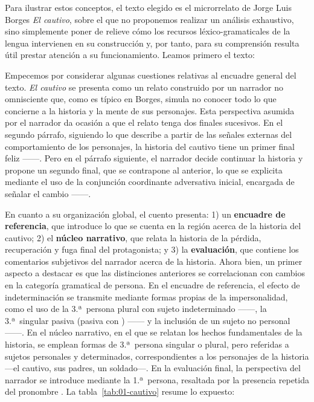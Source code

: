 Para ilustrar estos conceptos, el texto elegido es el microrrelato de Jorge
Luis Borges \textit{El cautivo}, sobre el que no proponemos realizar un
análisis exhaustivo, sino simplemente poner de relieve cómo los recursos
léxico-gramaticales de la lengua intervienen en su construcción y, por tanto,
para su comprensión resulta útil prestar atención a su funcionamiento. Leamos
primero el texto:

\begin{textolectura}[El cautivo, de J. L. Borges]
\end{textolectura}

Empecemos por considerar algunas cuestiones relativas al encuadre general del
texto. \textit{El cautivo} se presenta como un relato construido por un
narrador no omnisciente que, como es típico en Borges, simula no conocer todo
lo que concierne a la historia y la mente de sus personajes. Esta perspectiva
asumida por el narrador da ocasión a que el relato tenga dos finales sucesivos.
En el segundo párrafo, siguiendo lo que describe a partir de las señales
externas del comportamiento de los personajes, la historia del cautivo tiene un
primer final feliz ------. Pero en el párrafo siguiente, el
narrador decide continuar la historia y propone un segundo final, que se
contrapone al anterior, lo que se explicita mediante el uso de la conjunción
coordinante adversativa inicial, encargada de señalar el cambio
------.

En cuanto a su organización global, el cuento presenta: 1) un \textbf{encuadre
de referencia}, que introduce lo que se cuenta en la región acerca de la
historia del cautivo; 2) el \textbf{núcleo narrativo}, que relata la historia
de la pérdida, recuperación y fuga final del protagonista; y 3) la
\textbf{evaluación}, que contiene los comentarios subjetivos del narrador
acerca de la historia. Ahora bien, un primer aspecto a destacar es que las
distinciones anteriores se correlacionan con cambios en la categoría gramatical
de persona. En el encuadre de referencia, el efecto de indeterminación se
transmite mediante formas propias de la impersonalidad, como el uso de la
3.ª~persona plural con sujeto indeterminado ------, la 3.ª~singular pasiva (pasiva con )
------ y la inclusión de un sujeto no personal ------. En el núcleo narrativo, en el que se relatan los
hechos fundamentales de la historia, se emplean formas de 3.ª~persona singular
o plural, pero referidas a sujetos personales y determinados, correspondientes
a los personajes de la historia ---el cautivo, sus padres, un soldado---. En la
evaluación final, la perspectiva del narrador se introduce mediante la
1.ª~persona, resaltada por la presencia repetida del pronombre . La
tabla~\ref{tab:01-cautivo} resume lo expuesto:

